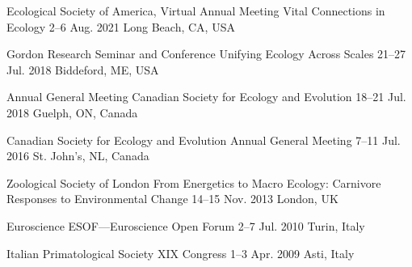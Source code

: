 

\begin{cventries}

  \cventry
    {Ecological Society of America, Virtual Annual Meeting} %
    {Vital Connections in Ecology} %
    {2--6 Aug. 2021} %
    {Long Beach, CA, USA} %
    {
    }

  \cventry
    {Gordon Research Seminar and Conference} %
    {Unifying Ecology Across Scales} %
    {21--27 Jul. 2018} %
    {Biddeford, ME, USA} %
    {
    }

  \cventry
    {Annual General Meeting} %
    {Canadian Society for Ecology and Evolution} %
    {18--21 Jul. 2018} %
    {Guelph, ON, Canada} %
    {
    }

  \cventry
    {Canadian Society for Ecology and Evolution} %
    {Annual General Meeting} %
    {7--11 Jul. 2016} %
    {St. John's, NL, Canada} %
    {
    }

  \cventry
    {Zoological Society of London} %
    {From Energetics to Macro Ecology: Carnivore Responses to Environmental Change} %
    {14--15 Nov. 2013} %
    {London, UK} %
    {
    }

  \cventry
    {Euroscience} %
    {ESOF---Euroscience Open Forum} %
    {2--7 Jul. 2010} %
    {Turin, Italy} %
    {
    }

  \cventry
    {Italian Primatological Society} %
    {XIX Congress} %
    {1--3 Apr. 2009} %
    {Asti, Italy} %
    {
    }

\end{cventries}
